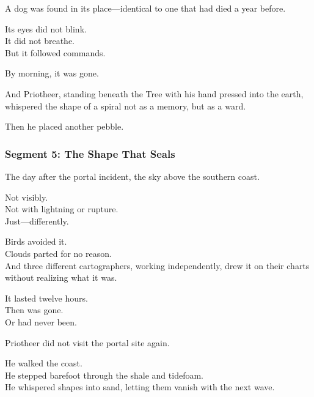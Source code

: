 \documentclass[9pt]{article}
\begin{document}
\vspace{0.5em}
A dog was found in its place---identical to one that had died a year before.

\vspace{0.5em}
Its eyes did not blink.\\
It did not breathe.\\
But it followed commands.

\vspace{0.5em}
By morning, it was gone.

\vspace{0.5em}
And Priotheer, standing beneath the Tree with his hand pressed into the earth, whispered the shape of a spiral not as a memory, but as a ward.

\vspace{0.5em}
Then he placed another pebble.

\newpage

\subsubsection*{Segment 5: The Shape That Seals}

The day after the portal incident, the sky above the southern coast.

\vspace{0.5em}
Not visibly.\\
Not with lightning or rupture.\\
Just---differently.

\vspace{0.5em}
Birds avoided it.\\
Clouds parted for no reason.\\
And three different cartographers, working independently, drew it on their charts without realizing what it was.

\vspace{0.5em}
It lasted twelve hours.\\
Then was gone.\\
Or had never been.

\vspace{0.5em}
Priotheer did not visit the portal site again.

\vspace{0.5em}
He walked the coast.\\
He stepped barefoot through the shale and tidefoam.\\
He whispered shapes into sand, letting them vanish with the next wave.
\end{document}
